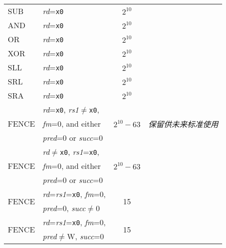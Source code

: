 \begin{table}[hbt]
\begin{tabular}{|l|l|c|l|}
  SUB                   & {\em rd}={\tt x0}                           & $2^{10}$                    & \multirow{17}{*}{\em 保留供未来标准使用} \\ \cline{1-3}
  AND                   & {\em rd}={\tt x0}                           & $2^{10}$                    & \\ \cline{1-3}
  OR                    & {\em rd}={\tt x0}                           & $2^{10}$                    & \\ \cline{1-3}
  XOR                   & {\em rd}={\tt x0}                           & $2^{10}$                    & \\ \cline{1-3}
  SLL                   & {\em rd}={\tt x0}                           & $2^{10}$                    & \\ \cline{1-3}
  SRL                   & {\em rd}={\tt x0}                           & $2^{10}$                    & \\ \cline{1-3}
  SRA                   & {\em rd}={\tt x0}                           & $2^{10}$                    & \\ \cline{1-3}
  \multirow{3}{*}{FENCE}& {\em rd}={\tt x0}, {\em rs1}$\neq${\tt x0}, & \multirow{3}{*}{$2^{10}-63$}& \\
                        & {\em fm}=0, and either                      &                             & \\
                        & {\em pred}=0 or {\em succ}=0                &                             & \\ \cline{1-3}
  \multirow{3}{*}{FENCE}& {\em rd}$\neq${\tt x0}, {\em rs1}={\tt x0}, & \multirow{3}{*}{$2^{10}-63$}& \\
                        & {\em fm}=0, and either                      &                             & \\
                        & {\em pred}=0 or {\em succ}=0                &                             & \\ \cline{1-3}
  \multirow{2}{*}{FENCE}& {\em rd}={\em rs1}={\tt x0}, {\em fm}=0,    & \multirow{2}{*}{15}         & \\
                        & {\em pred}=0, {\em succ}$\neq$0             &                             & \\ \cline{1-3}
  \multirow{2}{*}{FENCE}& {\em rd}={\em rs1}={\tt x0}, {\em fm}=0,    & \multirow{2}{*}{15}         & \\
                        & {\em pred}$\neq$W, {\em succ}=0             &                             & \\ \hline

\end{tabular}
\end{table}
